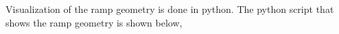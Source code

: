 Visualization of the ramp geometry is done in python. The python script that shows the ramp geometry is shown below,
